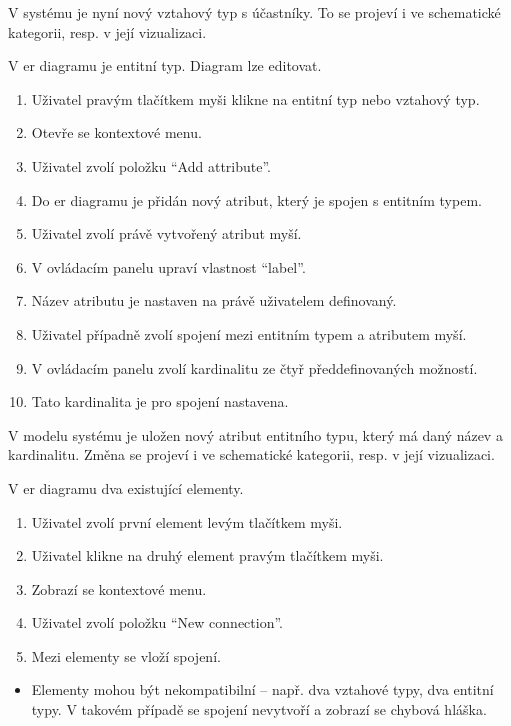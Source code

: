 \ucend{}
V systému je nyní nový vztahový typ s účastníky. To se projeví i ve schematické kategorii, resp. v její vizualizaci.

\ucstart{}
V \acrshort{er} diagramu je entitní typ. Diagram lze editovat.

\ucnormal{}
\begin{enumerate}
  \item Uživatel pravým tlačítkem myši klikne na entitní typ nebo vztahový typ.
  \item Otevře se kontextové menu.
  \item Uživatel zvolí položku \enquote{Add attribute}.
  \item Do \acrshort{er} diagramu je přidán nový atribut, který je spojen s entitním typem.
  \item Uživatel zvolí právě vytvořený atribut myší.
  \item V ovládacím panelu upraví vlastnost \enquote{label}.
  \item Název atributu je nastaven na právě uživatelem definovaný.
  \item Uživatel případně zvolí spojení mezi entitním typem a atributem myší.
  \item V ovládacím panelu zvolí kardinalitu ze čtyř předdefinovaných možností.
  \item Tato kardinalita je pro spojení nastavena.
\end{enumerate}

\ucend{}
V modelu systému je uložen nový atribut entitního typu, který má daný název a kardinalitu.
Změna se projeví i ve schematické kategorii, resp. v její vizualizaci.

\ucstart{}
V \acrshort{er} diagramu dva existující elementy.

\ucnormal{}
\begin{enumerate}
  \item Uživatel zvolí první element levým tlačítkem myši.
  \item Uživatel klikne na druhý element pravým tlačítkem myši.
  \item Zobrazí se kontextové menu.
  \item Uživatel zvolí položku \enquote{New connection}.
  \item Mezi elementy se vloží spojení.
\end{enumerate}

\ucerrors{}
\begin{itemize}
  \item Elementy mohou být nekompatibilní -- např. dva vztahové typy, dva entitní typy.
        V takovém případě se spojení nevytvoří a zobrazí se chybová hláška.
\end{itemize}

